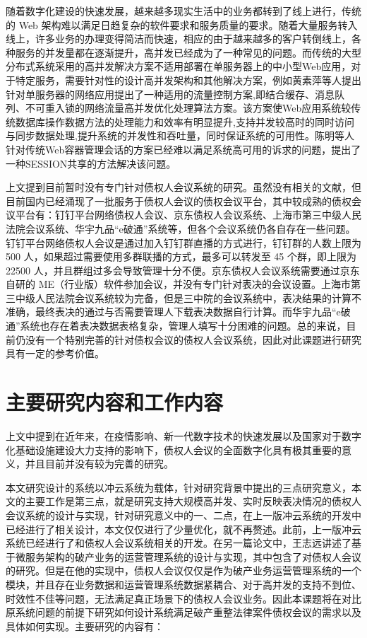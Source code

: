 随着数字化建设的快速发展，越来越多现实生活中的业务都转到了线上进行，传统的 Web 架构难以满足日趋复杂的软件要求和服务质量的要求。随着大量服务转入线上，许多业务的办理变得简洁而快速，相应的由于越来越多的客户转倒线上，各种服务的并发量都在逐渐提升，高并发已经成为了一种常见的问题。而传统的大型分布式系统采用的高并发解决方案不适用部署在单服务器上的中小型Web应用，对于特定服务，需要针对性的设计高并发架构和其他解决方案，例如黄素萍\cite{Huang}等人提出针对单服务器的网络应用提出了一种适用的流量控制方案,即结合缓存、消息队列、不可重入锁的网络流量高并发优化处理算法方案。该方案使Web应用系统较传统数据库操作数据方法的处理能力和效率有明显提升,支持并发较高时的同时访问与同步数据处理,提升系统的并发性和吞吐量，同时保证系统的可用性。陈明\cite{Chen}等人针对传统Web容器管理会话的方案已经难以满足系统高可用的诉求的问题，提出了一种SESSION共享的方法解决该问题。

上文提到目前暂时没有专门针对债权人会议系统的研究。虽然没有相关的文献，但目前国内已经涌现了一批服务于债权人会议的债权会议平台，其中较成熟的债权会议平台有：钉钉平台网络债权人会议、京东债权人会议系统、上海市第三中级人民法院会议系统、华宇九品“e破通”系统等，但各个会议系统仍各自存在一些问题。钉钉平台网络债权人会议是通过加入钉钉群直播的方式进行，钉钉群的人数上限为 500 人，如果超过需要使用多群联播的方式，最多可以转发至 45 个群，即上限为 22500 人，并且群组过多会导致管理十分不便。京东债权人会议系统需要通过京东自研的 ME（行业版）软件参加会议，并没有专门针对表决的会议设置。上海市第三中级人民法院会议系统较为完备，但是三中院的会议系统中，表决结果的计算不准确，最终表决的通过与否需要管理人下载表决数据自行计算。而华宇九品“e破通”系统也存在着表决数据表格复杂，管理人填写十分困难的问题。总的来说，目前仍没有一个特别完善的针对债权会议的债权人会议系统，因此对此课题进行研究具有一定的参考价值。

\section{主要研究内容和工作内容}
上文中提到在近年来，在疫情影响、新一代数字技术的快速发展以及国家对于数字化基础设施建设大力支持的影响下，债权人会议的全面数字化具有极其重要的意义，并且目前并没有较为完善的研究。

本文研究设计的系统以冲云系统为载体，针对研究背景中提出的三点研究意义，本文的主要工作是第三点，就是研究支持大规模高并发、实时反映表决情况的债权人会议系统的设计与实现，针对研究意义中的一、二点，在上一版冲云系统的开发中已经进行了相关设计，本文仅仅进行了少量优化，就不再赘述。此前，上一版冲云系统已经进行了和债权人会议系统相关的开发。在另一篇论文中，王志远\cite{Wang2021}讲述了基于微服务架构的破产业务的运营管理系统的设计与实现，其中包含了对债权人会议的研究。但是在他的实现中，债权人会议仅仅是作为破产业务运营管理系统的一个模块，并且存在业务数据和运营管理系统数据紧耦合、对于高并发的支持不到位、时效性不佳等问题，无法满足真正场景下的债权人会议业务。因此本课题将在对比原系统问题的前提下研究如何设计系统满足破产重整法律案件债权会议的需求以及具体如何实现。主要研究的内容有：

